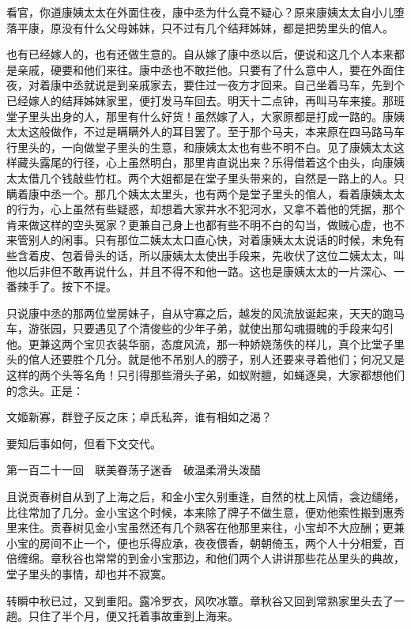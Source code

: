 \documentclass[12pt,UTF8]{ctexbook}
\begin{document}
{{{看官，你道康姨太太在外面住夜，康中丞为什么竟不疑心？原来康姨太太自小儿堕落平康，原没有什么父母姊妹，只不过有几个结拜姊妹，都是把势里头的倌人。

也有已经嫁人的，也有还做生意的。自从嫁了康中丞以后，便说和这几个人本来都是亲戚，硬要和他们来往。康中丞也不敢拦他。只要有了什么意中人，要在外面住夜，对着康中丞就说是到亲戚家去，要住过一夜方才回来。自己坐着马车，先到个已经嫁人的结拜姊妹家里，便打发马车回去。明天十二点钟，再叫马车来接。那班堂子里头出身的人，那里有什么好货！虽然嫁了人，大家原都是打成一路的。康姨太太这般做作，不过是瞒瞒外人的耳目罢了。至于那个马夫，本来原在四马路马车行里头的，一向做堂子里头的生意，和康姨太太也有些不明不白。见了康姨太太这样藏头露尾的行径，心上虽然明白，那里肯直说出来？乐得借着这个由头，向康姨太太借几个钱敲些竹杠。两个大姐都是在堂子里头带来的，自然是一路上的人。只瞒着康中丞一个。那几个姨太太里头，也有两个是堂子里头的倌人，看着康姨太太的行为，心上虽然有些疑惑，却想着大家井水不犯河水，又拿不着他的凭据，那个肯来做这样的空头冤家？更兼自己身上也都有些不明不白的勾当，做贼心虚，也不来管别人的闲事。只有那位二姨太太口直心快，对着康姨太太说话的时候，未免有些含着皮、包着骨头的话，所以康姨太太使出手段来，先收伏了这位二姨太太，叫他以后非但不敢再说什么，并且不得不和他一路。这也是康姨太太的一片深心、一番辣手了。按下不提。

只说康中丞的那两位堂房妹子，自从守寡之后，越发的风流放诞起来，天天的跑马车，游张园，只要遇见了个清俊些的少年子弟，就使出那勾魂摄魄的手段来勾引他。更兼这两个宝贝衣装华丽，态度风流，那一种娇娆荡佚的样儿，真个比堂子里头的倌人还要胜个几分。就是他不吊别人的膀子，别人还要来寻着他们；何况又是这样的两个头等名角！只引得那些滑头子弟，如蚁附膻，如蝇逐臭，大家都想他们的念头。正是：

文姬新寡，群登子反之床；卓氏私奔，谁有相如之渴？

要知后事如何，但看下文交代。





第一百二十一回　联美眷荡子迷香　破温柔滑头泼醋





且说贡春树自从到了上海之后，和金小宝久别重逢，自然的枕上风情，衾边缱绻，比往常加了几分。金小宝这个时候，本来除了牌子不做生意，便劝他索性搬到惠秀里来住。贡春树见金小宝虽然还有几个熟客在他那里来往，小宝却不大应酬；更兼小宝的房间不止一个，便也乐得应承，夜夜偎香，朝朝倚玉，两个人十分相爱，百倍缠绵。章秋谷也常常的到金小宝那边，和他们两个人讲讲那些花丛里头的典故，堂子里头的事情，却也并不寂寞。

转瞬中秋已过，又到重阳。露冷罗衣，风吹冰簟。章秋谷又回到常熟家里头去了一趟。只住了半个月，便又托着事故重到上海来。

}}}
\end{document}
